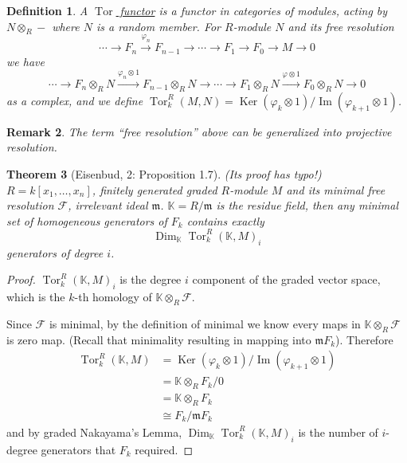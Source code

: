 \documentclass[11pt]{article}
\DeclareMathOperator{\Ker}{Ker}
\DeclareMathOperator{\ImOp}{Im} %
\DeclareMathOperator{\Tor}{Tor}
\DeclareMathOperator{\Dim}{Dim}
\newtheorem{theorem}{Theorem}[section]
\newtheorem{definition}[theorem]{Definition}
\newtheorem{remark}[theorem]{Remark}
\begin{document}
\begin{definition}
    A \underline{$\Tor$ functor} is a functor in categories of modules, acting by $N \otimes_R - $ where $N$ is a random member. For $R$-module $N$ and its free resolution
    $$ \cdots \to F_n \xrightarrow{\varphi_n} F_{n-1} \to \cdots \to F_1 \to F_0 \to M \to 0 $$
    we have
    $$ \cdots \to F_n \otimes_R N \xrightarrow{\varphi_n \otimes 1} F_{n-1} \otimes_R N \to \cdots \to F_1 \otimes_R N \xrightarrow{\varphi \otimes 1} F_0 \otimes_R N \to 0 $$
    as a complex, and we define $\Tor_k^R(M, N) = \Ker(\varphi_k \otimes 1) / \ImOp(\varphi_{k+1} \otimes 1)$.
\end{definition}

\begin{remark}
    The term ``free resolution'' above can be generalized into projective resolution.
\end{remark}

\begin{theorem}[Eisenbud, 2: Proposition 1.7] (Its proof has typo!)
    $R = k[x_1, \dots, x_n]$, finitely generated graded $R$-module $M$ and its minimal free resolution $\mathcal{F}$, irrelevant ideal $\mathfrak{m}$. $\mathbb{K} = R/\mathfrak{m}$ is the residue field, then any minimal set of homogeneous generators of $F_k$ contains exactly
    $$ \Dim_{\mathbb{K}} \Tor_k^R(\mathbb{K}, M)_i $$
    generators of degree $i$.
\end{theorem}
\begin{proof}
    $\Tor_k^R(\mathbb{K}, M)_i$ is the degree $i$ component of the graded vector space, which is the $k$-th homology of $\mathbb{K} \otimes_R \mathcal{F}$.
    
    Since $\mathcal{F}$ is minimal, by the definition of minimal we know every maps in $\mathbb{K} \otimes_R \mathcal{F}$ is zero map. (Recall that minimality resulting in mapping into $\mathfrak{m}F_k$).
    Therefore 
    $$ \begin{aligned}
        \Tor_k^R(\mathbb{K}, M) &= \Ker(\varphi_k \otimes 1) / \ImOp(\varphi_{k+1} \otimes 1) \\
        &= \mathbb{K} \otimes_R F_k / 0 \\
        &= \mathbb{K} \otimes_R F_k \\
        &\cong F_k / \mathfrak{m}F_k
    \end{aligned} $$
    and by graded Nakayama's Lemma, $\Dim_{\mathbb{K}} \Tor_k^R(\mathbb{K}, M)_i$ is the number of $i$-degree generators that $F_k$ required.
\end{proof}
\end{document}
